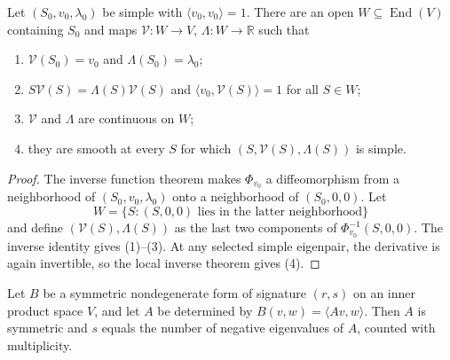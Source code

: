 \begin{proposition}
\label{prop:smooth-eigen-selection}





Let $(S_0,v_0,\lambda_0)$ be simple with $\langle v_0,v_0\rangle=1$. There are
an open $W\subseteq\operatorname{End}(V)$ containing $S_0$ and maps
$\mathcal V\colon W\to V$, $\Lambda\colon W\to\mathbb R$ such that
\begin{enumerate}
\item $\mathcal V(S_0)=v_0$ and $\Lambda(S_0)=\lambda_0$;
\item $S\mathcal V(S)=\Lambda(S)\mathcal V(S)$ and
$\langle v_0,\mathcal V(S)\rangle=1$ for all $S\in W$;
\item $\mathcal V$ and $\Lambda$ are continuous on $W$;
\item they are smooth at every $S$ for which
$(S,\mathcal V(S),\Lambda(S))$ is simple.
\end{enumerate}
\end{proposition}

\begin{proof}

\sketch The inverse function theorem makes $\Phi_{v_0}$ a diffeomorphism from a
neighborhood of $(S_0,v_0,\lambda_0)$ onto a neighborhood of $(S_0,0,0)$. Let
\[
W=\{S:(S,0,0)\text{ lies in the latter neighborhood}\}
\]
and define $(\mathcal V(S),\Lambda(S))$ as the last two components of
$\Phi_{v_0}^{-1}(S,0,0)$. The inverse identity gives (1)--(3). At any selected
simple eigenpair, the derivative is again invertible, so the local inverse theorem
gives (4).
\end{proof}

\begin{lemma}
\label{lem:signature-and-eigenvalue-signs}





Let $B$ be a symmetric nondegenerate form of signature $(r,s)$ on an inner product
space $V$, and let $A$ be determined by
$B(v,w)=\langle Av,w\rangle$. Then $A$ is symmetric and $s$ equals the number of
negative eigenvalues of $A$, counted with multiplicity.
\end{lemma}

